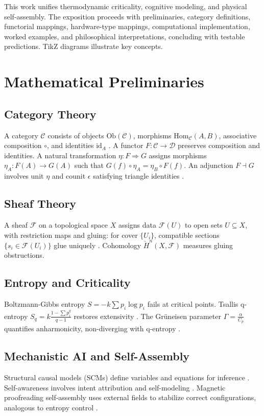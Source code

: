 \documentclass{article}
\theoremstyle{plain}
\theoremstyle{definition}
\begin{document}
This work unifies thermodynamic criticality, cognitive modeling, and physical self-assembly. The exposition proceeds with preliminaries, category definitions, functorial mappings, hardware-type mappings, computational implementation, worked examples, and philosophical interpretations, concluding with testable predictions. TikZ diagrams illustrate key concepts.

\section{Mathematical Preliminaries}

\subsection{Category Theory}
A category $\mathcal{C}$ consists of objects $\text{Ob}(\mathcal{C})$, morphisms $\text{Hom}_{\mathcal{C}}(A, B)$, associative composition $\circ$, and identities $\text{id}_A$ \cite{Awodey2010,Lawvere2009}. A functor $F: \mathcal{C} \to \mathcal{D}$ preserves composition and identities. A natural transformation $\eta: F \Rightarrow G$ assigns morphisms $\eta_A: F(A) \to G(A)$ such that $G(f) \circ \eta_A = \eta_B \circ F(f)$. An adjunction $F \dashv G$ involves unit $\eta$ and counit $\epsilon$ satisfying triangle identities \cite{Spivak2014}.

\subsection{Sheaf Theory}
A sheaf $\mathcal{F}$ on a topological space $X$ assigns data $\mathcal{F}(U)$ to open sets $U \subseteq X$, with restriction maps and gluing: for cover $\{U_i\}$, compatible sections $\{s_i \in \mathcal{F}(U_i)\}$ glue uniquely \cite{MacLane1992,Bredon1997}. Cohomology $\check{H}^n(X, \mathcal{F})$ measures gluing obstructions.

\subsection{Entropy and Criticality}
Boltzmann-Gibbs entropy $S = -k \sum p_i \log p_i$ fails at critical points. Tsallis q-entropy $S_q = k \frac{1 - \sum p_i^q}{q-1}$ restores extensivity \cite{Tsallis1988}. The Gr\"uneisen parameter $\Gamma = \frac{\alpha}{C_p}$ quantifies anharmonicity, non-diverging with q-entropy \cite{Soares2023,Soares2024}.

\subsection{Mechanistic AI and Self-Assembly}
Structural causal models (SCMs) define variables and equations for inference \cite{Pearl2009}. Self-awareness involves intent attribution and self-modeling \cite{Bennett2025,Goguen1992}. Magnetic proofreading self-assembly uses external fields to stabilize correct configurations, analogous to entropy control \cite{Liang2025}.
\end{document}
